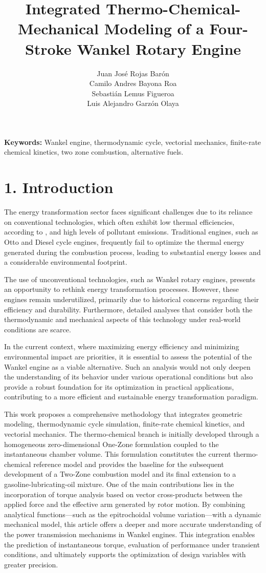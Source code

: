 \documentclass[man,floatsintext,noextraspace]{apa6}
\title{Integrated Thermo-Chemical-Mechanical Modeling of a Four-Stroke Wankel Rotary Engine}
\author{
Juan José Rojas Barón \\
Camilo Andres Bayona Roa \\
Sebastián Lemus Figueroa \\
Luis Alejandro Garzón Olaya 
}
\affiliation{Pontificia Universidad Javeriana}
\begin{document}
\maketitle

\textbf{Keywords:} Wankel engine, thermodynamic cycle, vectorial mechanics, finite-rate chemical kinetics, two zone combustion, alternative fuels.

\section{1. Introduction}

The energy transformation sector faces significant challenges due to its reliance on conventional technologies, which often exhibit low thermal efficiencies, according to \cite{Wang2021}, and high levels of pollutant emissions. Traditional engines, such as Otto and Diesel cycle engines, frequently fail to optimize the thermal energy generated during the combustion process, leading to substantial energy losses and a considerable environmental footprint.

The use of unconventional technologies, such as Wankel rotary engines, presents an opportunity to rethink energy transformation processes. However, these engines remain underutilized, primarily due to historical concerns regarding their efficiency and durability. Furthermore, detailed analyses that consider both the thermodynamic and mechanical aspects of this technology under real-world conditions are scarce.

In the current context, where maximizing energy efficiency and minimizing environmental impact are priorities, it is essential to assess the potential of the Wankel engine as a viable alternative. Such an analysis would not only deepen the understanding of its behavior under various operational conditions but also provide a robust foundation for its optimization in practical applications, contributing to a more efficient and sustainable energy transformation paradigm.

This work proposes a comprehensive methodology that integrates geometric modeling, thermodynamic cycle simulation, finite-rate chemical kinetics, and vectorial mechanics. The thermo-chemical branch is initially developed through a homogeneous zero-dimensional One-Zone formulation coupled to the instantaneous chamber volume. This formulation constitutes the current thermo-chemical reference model and provides the baseline for the subsequent development of a Two-Zone combustion model and its final extension to a gasoline-lubricating-oil mixture. One of the main contributions lies in the incorporation of torque analysis based on vector cross-products between the applied force and the effective arm generated by rotor motion. By combining analytical functions—such as the epitrochoidal volume variation—with a dynamic mechanical model, this article offers a deeper and more accurate understanding of the power transmission mechanisms in Wankel engines. This integration enables the prediction of instantaneous torque, evaluation of performance under transient conditions, and ultimately supports the optimization of design variables with greater precision.
\end{document}
